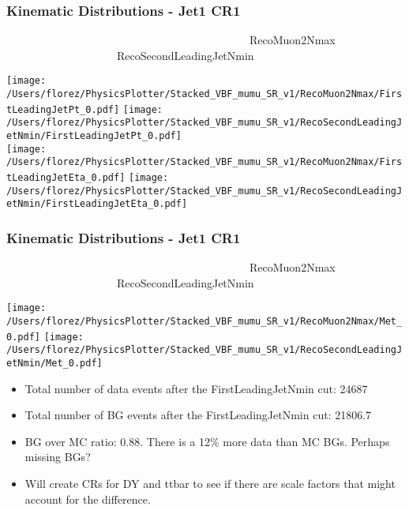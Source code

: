 \documentclass{beamer}
\begin{document}
\begin{frame}
\frametitle{Kinematic Distributions - Jet1 CR1}
\tiny{~~~~~~~~~~~~~~~~~~~~~~~~~~~~~~~~~~~~~~~~~~~~RecoMuon2Nmax~~~~~~~~~~~~~~~~~~~~~~~~~~~~~~~~RecoSecondLeadingJetNmin}\\
\begin{center}
 
   \texttt{[image: /Users/florez/PhysicsPlotter/Stacked\_VBF\_mumu\_SR\_v1/RecoMuon2Nmax/FirstLeadingJetPt\_0.pdf]}
  \texttt{[image: /Users/florez/PhysicsPlotter/Stacked\_VBF\_mumu\_SR\_v1/RecoSecondLeadingJetNmin/FirstLeadingJetPt\_0.pdf]}\\
  
  
    \texttt{[image: /Users/florez/PhysicsPlotter/Stacked\_VBF\_mumu\_SR\_v1/RecoMuon2Nmax/FirstLeadingJetEta\_0.pdf]}
  \texttt{[image: /Users/florez/PhysicsPlotter/Stacked\_VBF\_mumu\_SR\_v1/RecoSecondLeadingJetNmin/FirstLeadingJetEta\_0.pdf]}
 
\end{center}

\end{frame}

\begin{frame}
\frametitle{Kinematic Distributions - Jet1 CR1}
\tiny{~~~~~~~~~~~~~~~~~~~~~~~~~~~~~~~~~~~~~~~~~~~~RecoMuon2Nmax~~~~~~~~~~~~~~~~~~~~~~~~~~~~~~~~RecoSecondLeadingJetNmin}\\
\begin{center}
   \texttt{[image: /Users/florez/PhysicsPlotter/Stacked\_VBF\_mumu\_SR\_v1/RecoMuon2Nmax/Met\_0.pdf]}
  \texttt{[image: /Users/florez/PhysicsPlotter/Stacked\_VBF\_mumu\_SR\_v1/RecoSecondLeadingJetNmin/Met\_0.pdf]}\\
  
 \begin{itemize}
   \item Total number of data events after the FirstLeadingJetNmin cut: 24687
   \item Total number of BG events after the FirstLeadingJetNmin cut: 21806.7
   \item BG over MC ratio: 0.88. There is a 12\% more data than MC BGs. Perhaps missing BGs?
   \item Will create CRs for DY and ttbar to see if there are scale factors that might account for the difference. 
 \end{itemize}
   
\end{center}

\end{frame}
\end{document}
